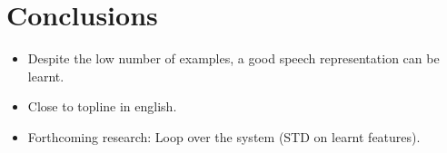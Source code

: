 \documentclass[final]{beamer}
\newcommand{\abnet}{{\sc ABnet}}
\begin{document}
\begin{frame}[t]
\begin{multicols}{2}
\begin{itemize}
%
%
\end{itemize}




\section{Conclusions}

\begin{itemize}
\item Despite the low number of examples, a good speech representation can be learnt.
\item Close to topline in english.
\item Forthcoming research: Loop over the system (STD on learnt features).
\end{itemize}




\end{multicols}
\end{frame}
\end{document}
